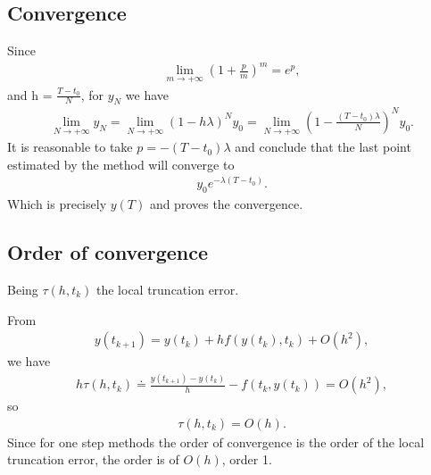 \documentclass[letterpaper,10pt,english]{jupyterBook}
\begin{document}
\subsection{Convergence}
\label{\detokenize{appendix:convergence}}
\sphinxAtStartPar
Since
\begin{equation*}
\begin{split}
\lim_{m \to +\infty} \left(1 + \frac{p}{m} \right)^m = e^p,
\end{split}
\end{equation*}
\sphinxAtStartPar
and h = \(\frac{T-t_0}{N}\), for \(y_N\) we have
\begin{equation*}
\begin{split}
\lim_{N \to +\infty} y_N = \lim_{N \to +\infty} \left(1 - h \lambda \right)^N y_0 = \lim_{N \to +\infty} \left(1 - \frac{(T-t_0) \lambda}{N} \right)^N y_0.
\end{split}
\end{equation*}
\sphinxAtStartPar
It is reasonable to take \(p = -(T-t_0) \lambda\) and conclude that the last point estimated by the method will converge to
\begin{equation*}
\begin{split}
y_0e^{-\lambda (T-t_0)}.
\end{split}
\end{equation*}
\sphinxAtStartPar
Which is precisely \(y(T)\) and proves the convergence.


\subsection{Order of convergence}
\label{\detokenize{appendix:order-of-convergence}}
\sphinxAtStartPar
Being \(\tau(h, t_k)\) the local truncation error.

\sphinxAtStartPar
From
\begin{equation*}
\begin{split}
    y(t_{k+1}) = y(t_k) + h f(y(t_k),t_k) + O(h^2),
\end{split}
\end{equation*}
\sphinxAtStartPar
we have
\begin{equation*}
\begin{split}
    h \tau(h, t_k) \doteq \frac{y(t_{k+1}) - y(t_k)}{h} - f(t_k, y(t_k)) = O(h^2),
\end{split}
\end{equation*}
\sphinxAtStartPar
so
\begin{equation*}
\begin{split}
    \tau(h, t_k) = O(h).
\end{split}
\end{equation*}
\sphinxAtStartPar
Since for one step methods the order of convergence is the order of the local truncation error, the order is of \(O(h)\), order 1.







\renewcommand{\indexname}{Index}
\printindex
\end{document}
